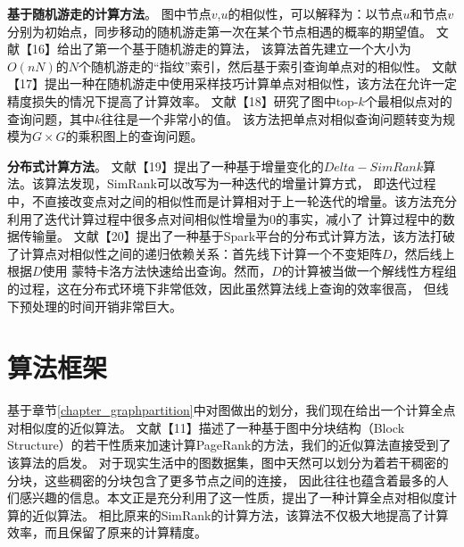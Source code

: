 \documentclass[master]{njuthesis}
\begin{document}
\textbf{基于随机游走的计算方法}。
图中节点$v$,$u$的相似性，可以解释为：以节点$u$和节点$v$分别为初始点，同步移动的随机游走第一次在某个节点相遇的概率的期望值。
文献【16】给出了第一个基于随机游走的算法， 该算法首先建立一个大小为$O(nN)$的$N$个随机游走的“指纹”索引，然后基于索引查询单点对的相似性。
文献【17】提出一种在随机游走中使用采样技巧计算单点对相似性，该方法在允许一定精度损失的情况下提高了计算效率。
文献【18】研究了图中top-$k$个最相似点对的查询问题，其中$k$往往是一个非常小的值。
该方法把单点对相似查询问题转变为规模为$G\times G$的乘积图上的查询问题。

\textbf{分布式计算方法}。 文献【19】提出了一种基于增量变化的$Delta-SimRank$算法。该算法发现，SimRank可以改写为一种迭代的增量计算方式，
即迭代过程中，不直接改变点对之间的相似性而是计算相对于上一轮迭代的增量。该方法充分利用了迭代计算过程中很多点对间相似性增量为0的事实，减小了
计算过程中的数据传输量。
文献【20】提出了一种基于Spark平台的分布式计算方法，该方法打破了计算点对相似性之间的递归依赖关系：首先线下计算一个不变矩阵$D$，然后线上根据$D$使用
蒙特卡洛方法快速给出查询。然而，$D$的计算被当做一个解线性方程组的过程，这在分布式环境下非常低效，因此虽然算法线上查询的效率很高，
但线下预处理的时间开销非常巨大。
\section{算法框架}
基于章节\ref{chapter_graphpartition}中对图做出的划分，我们现在给出一个计算全点对相似度的近似算法。
文献【11】描述了一种基于图中分块结构（Block Structure）的若干性质来加速计算PageRank的方法，我们的近似算法直接受到了该算法的启发。
对于现实生活中的图数据集，图中天然可以划分为着若干稠密的分块，这些稠密的分块包含了更多节点之间的连接，
因此往往也蕴含着最多的人们感兴趣的信息。本文正是充分利用了这一性质，提出了一种计算全点对相似度计算的近似算法。
相比原来的SimRank的计算方法，该算法不仅极大地提高了计算效率，而且保留了原来的计算精度。
\end{document}

